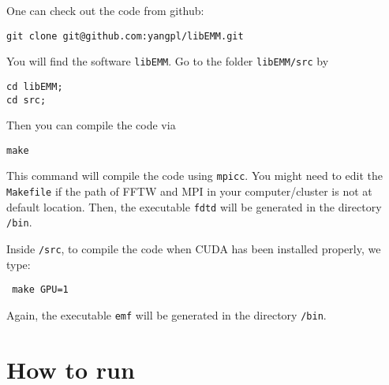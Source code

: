 \documentclass[10pt]{article}
\begin{document}
One can check out the code from github:
\begin{verbatim}
git clone git@github.com:yangpl/libEMM.git
\end{verbatim}
You will find the software \verb|libEMM|. Go to the folder \verb|libEMM/src| by
\begin{verbatim}
cd libEMM;
cd src;
\end{verbatim}
Then you can compile the code via
\begin{verbatim}
make
\end{verbatim}
This command will compile the code using \verb|mpicc|. You might need to edit the \verb|Makefile| if the path of FFTW and MPI in your computer/cluster is not at default location. 
Then, the executable \texttt{fdtd} will be generated in the directory \texttt{/bin}. 

Inside \texttt{/src}, to compile the code when CUDA has been installed properly, we type:
\begin{verbatim}
 make GPU=1
\end{verbatim}
Again, the executable \texttt{emf} will be generated in the directory \texttt{/bin}. 


\section{How to run}
\end{document}
